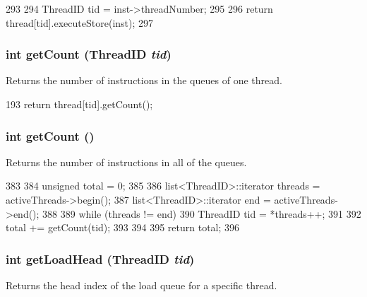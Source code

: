 \begin{DoxyCode}
293 {
294     ThreadID tid = inst->threadNumber;
295 
296     return thread[tid].executeStore(inst);
297 }
\end{DoxyCode}
\hypertarget{classLSQ_aa2a7dc807b5a961bae06a5aa5b348448}{
\subsubsection[{getCount}]{\setlength{\rightskip}{0pt plus 5cm}int getCount ({\bf ThreadID} {\em tid})}}
\label{classLSQ_aa2a7dc807b5a961bae06a5aa5b348448}
Returns the number of instructions in the queues of one thread. 


\begin{DoxyCode}
193     { return thread[tid].getCount(); }
\end{DoxyCode}
\hypertarget{classLSQ_ae452b1c7e00c383f2916c4a530fab737}{
\subsubsection[{getCount}]{\setlength{\rightskip}{0pt plus 5cm}int getCount ()}}
\label{classLSQ_ae452b1c7e00c383f2916c4a530fab737}
Returns the number of instructions in all of the queues. 


\begin{DoxyCode}
383 {
384     unsigned total = 0;
385 
386     list<ThreadID>::iterator threads = activeThreads->begin();
387     list<ThreadID>::iterator end = activeThreads->end();
388 
389     while (threads != end) {
390         ThreadID tid = *threads++;
391 
392         total += getCount(tid);
393     }
394 
395     return total;
396 }
\end{DoxyCode}
\hypertarget{classLSQ_afa7f4e992343baa21a2580e2243e71e0}{
\subsubsection[{getLoadHead}]{\setlength{\rightskip}{0pt plus 5cm}int getLoadHead ({\bf ThreadID} {\em tid})}}
\label{classLSQ_afa7f4e992343baa21a2580e2243e71e0}
Returns the head index of the load queue for a specific thread. 


